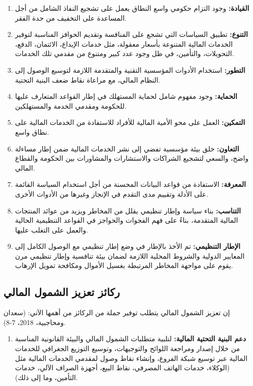 \documentclass[10pt,a4paper]{report}
\begin{document}
\begin{doublespacing}
\begin{enumerate}
	\item \textbf{القيادة:} وجود التزام حكومي واسع النطاق يعمل على تشجيع النفاذ الشامل من أجل المساعدة على التخفيف من حدة الفقر.
	\item \textbf{التنوع:} تطبيق السياسات التي تشجع على المنافسة وتقديم الحوافز المناسبة لتوفير الخدمات المالية المتنوعة بأسعار معقولة، مثل خدمات الإيداع، الائتمان، الدفع، التحويلات، والتأمين، في ظل وجود عدد كبير ومتنوع من مقدمي تلك الخدمات.
	\item \textbf{التطور:} استخدام الأدوات المؤسسية التقنية والمتقدمة اللازمة لتوسيع الوصول إلى النظام المالي، مع مراعاة نقاط ضعف البنية التحتية.
	\item \textbf{الحماية:} وجود مفهوم شامل لحماية المستهلك في إطار القواعد المتعارف عليها للحكومة ومقدمي الخدمة والمستهلكين.
	\item \textbf{التمكين:} العمل على محو الأمية المالية للأفراد للاستفادة من الخدمات المالية على نطاق واسع.
	\item \textbf{التعاون:} خلق بيئة مؤسسية تفضي إلى نشر الخدمات المالية ضمن إطار مساءلة واضح، والسعي لتشجيع الشراكات والاستشارات والمشاورات بين الحكومة والقطاع المالي.
	\item \textbf{المعرفة:} الاستفادة من قواعد البيانات المحسنة من أجل استخدام السياسة القائمة على الأدلة وتقييم مدى التقدم في الإنجاز وغيرها من الأدوات الأخرى.
	\item \textbf{التناسب:} بناء سياسة وإطار تنظيمي يقلل من المخاطر ويزيد من عوائد المنتجات المالية المتقدمة، بناءً على فهم الفجوات والحواجز في القواعد التنظيمية الحالية والعمل على التغلب عليها.
	\item \textbf{الإطار التنظيمي:} تم الأخذ بالإطار في وضع إطار تنظيمي مع الوصول الكامل إلى المعايير الدولية والشروط المحلية اللازمة لضمان بيئة تنافسية وإطار تنظيمي مرن يقوم على مواجهة المخاطر المرتبطة بغسيل الأموال ومكافحة تمويل الإرهاب.
\end{enumerate}
\subsection{ركائز تعزيز الشمول المالي}
إن تعزيز الشمول المالي يتطلب توفير جملة من الركائز من أهمها الآتي: (سعدان ومحاجبية، 2018، 7-8).

\begin{enumerate}
	\item \textbf{دعم البنية التحتية المالية:} 
	لتلبية متطلبات الشمول المالي والبيئة القانونية المناسبة من خلال إصدار ومراجعة اللوائح والتوجيهات، وتوسيع التوزيع الجغرافي للخدمات المالية عبر توسيع شبكة الفروع، وإنشاء نقاط وصول لمقدمي الخدمات المالية مثل (الوكلاء، خدمات الهاتف المصرفي، نقاط البيع، أجهزة الصراف الآلي، خدمات التأمين، وما إلى ذلك).
	

\end{enumerate}
\end{doublespacing}
\end{document}
